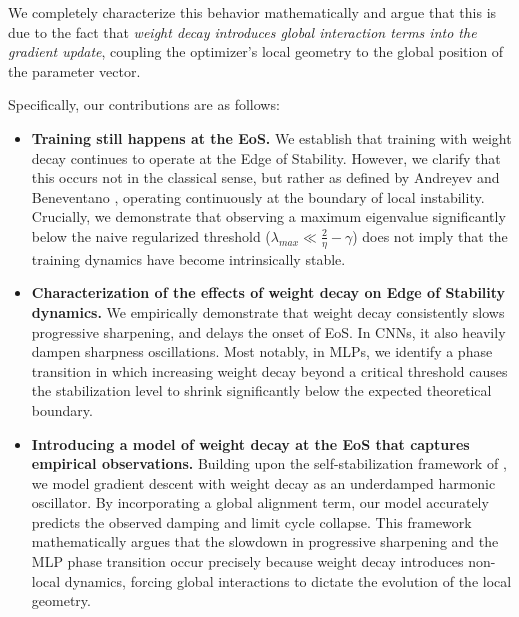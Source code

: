 \documentclass{article}
\begin{document}
We completely characterize this behavior mathematically and argue that this is due to the fact that \emph{weight decay introduces global interaction terms into the gradient update}, coupling the optimizer's local geometry to the global position of the parameter vector.

Specifically, our contributions are as follows:
\begin{itemize}[leftmargin=1em,itemsep=0.6em,topsep=0.15em,parsep=0pt]
    \item \textbf{Training still happens at the EoS.} We establish that training with weight decay continues to operate at the Edge of Stability. However, we clarify that this occurs not in the classical sense, but rather as defined by Andreyev and Beneventano \citep{andreyev_beneventano}, operating continuously at the boundary of local instability. Crucially, we demonstrate that observing a maximum eigenvalue significantly below the naive regularized threshold ($\lambda_{max} \ll \frac{2}{\eta} - \gamma$) does not imply that the training dynamics have become intrinsically stable.
    
    \item \textbf{Characterization of the effects of weight decay on Edge of Stability dynamics.} We empirically demonstrate that weight decay consistently slows progressive sharpening, and delays the onset of EoS. In CNNs, it also heavily dampen sharpness oscillations. Most notably, in MLPs, we identify a phase transition in which increasing weight decay beyond a critical threshold causes the stabilization level to shrink significantly below the expected theoretical boundary.
    
    \item \textbf{Introducing a model of weight decay at the EoS that captures empirical observations.} Building upon the self-stabilization framework of \citep{damian_selfstab}, we model gradient descent with weight decay as an underdamped harmonic oscillator. By incorporating a global alignment term, our model accurately predicts the observed damping and limit cycle collapse. This framework mathematically argues that the slowdown in progressive sharpening and the MLP phase transition occur precisely because weight decay introduces non-local dynamics, forcing global interactions to dictate the evolution of the local geometry.
    

\end{itemize}
\end{document}
